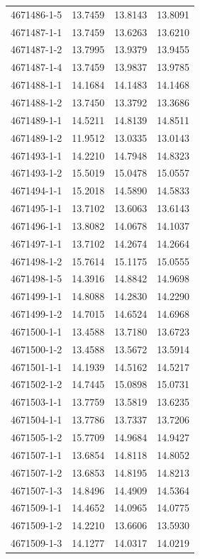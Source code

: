 \begin{longtable}{lrrr}
4671486-1-5 & 13.7459 & 13.8143 & 13.8091 \\
4671487-1-1 & 13.7459 & 13.6263 & 13.6210 \\
4671487-1-2 & 13.7995 & 13.9379 & 13.9455 \\
4671487-1-4 & 13.7459 & 13.9837 & 13.9785 \\
4671488-1-1 & 14.1684 & 14.1483 & 14.1468 \\
4671488-1-2 & 13.7450 & 13.3792 & 13.3686 \\
4671489-1-1 & 14.5211 & 14.8139 & 14.8511 \\
4671489-1-2 & 11.9512 & 13.0335 & 13.0143 \\
4671493-1-1 & 14.2210 & 14.7948 & 14.8323 \\
4671493-1-2 & 15.5019 & 15.0478 & 15.0557 \\
4671494-1-1 & 15.2018 & 14.5890 & 14.5833 \\
4671495-1-1 & 13.7102 & 13.6063 & 13.6143 \\
4671496-1-1 & 13.8082 & 14.0678 & 14.1037 \\
4671497-1-1 & 13.7102 & 14.2674 & 14.2664 \\
4671498-1-2 & 15.7614 & 15.1175 & 15.0555 \\
4671498-1-5 & 14.3916 & 14.8842 & 14.9698 \\
4671499-1-1 & 14.8088 & 14.2830 & 14.2290 \\
4671499-1-2 & 14.7015 & 14.6524 & 14.6968 \\
4671500-1-1 & 13.4588 & 13.7180 & 13.6723 \\
4671500-1-2 & 13.4588 & 13.5672 & 13.5914 \\
4671501-1-1 & 14.1939 & 14.5162 & 14.5217 \\
4671502-1-2 & 14.7445 & 15.0898 & 15.0731 \\
4671503-1-1 & 13.7759 & 13.5819 & 13.6235 \\
4671504-1-1 & 13.7786 & 13.7337 & 13.7206 \\
4671505-1-2 & 15.7709 & 14.9684 & 14.9427 \\
4671507-1-1 & 13.6854 & 14.8118 & 14.8052 \\
4671507-1-2 & 13.6853 & 14.8195 & 14.8213 \\
4671507-1-3 & 14.8496 & 14.4909 & 14.5364 \\
4671509-1-1 & 14.4652 & 14.0965 & 14.0775 \\
4671509-1-2 & 14.2210 & 13.6606 & 13.5930 \\
4671509-1-3 & 14.1277 & 14.0317 & 14.0219 \\

\end{longtable}
